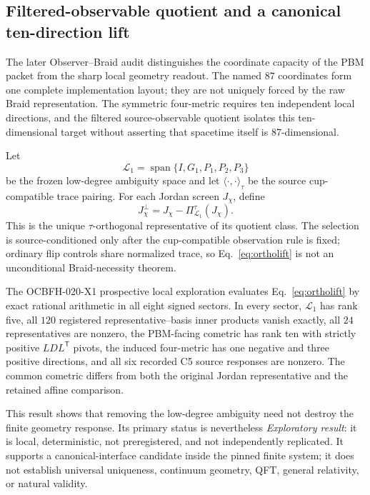 \documentclass[11pt]{article}
\theoremstyle{definition}
\theoremstyle{remark}
\begin{document}
\subsection{Filtered-observable quotient and a canonical ten-direction lift}

The later Observer--Braid audit distinguishes the coordinate capacity of the PBM packet from the sharp local geometry readout. The named $87$ coordinates form one complete implementation layout; they are not uniquely forced by the raw Braid representation. The symmetric four-metric requires ten independent local directions, and the filtered source-observable quotient isolates this ten-dimensional target without asserting that spacetime itself is 87-dimensional.

Let
\begin{equation}
 \mathcal L_1=\operatorname{span}\{I,G_1,P_1,P_2,P_3\}
\end{equation}
be the frozen low-degree ambiguity space and let $\langle\cdot,\cdot\rangle_\tau$ be the source cup-compatible trace pairing. For each Jordan screen $J_\chi$, define
\begin{equation}\label{eq:ortholift}
 J_\chi^\perp=J_\chi-\Pi_{\mathcal L_1}^{\tau}(J_\chi).
\end{equation}
This is the unique $\tau$-orthogonal representative of its quotient class. The selection is source-conditioned only after the cup-compatible observation rule is fixed; ordinary flip controls share normalized trace, so Eq.~\eqref{eq:ortholift} is not an unconditional Braid-necessity theorem.

The OCBFH-020-X1 prospective local exploration evaluates Eq.~\eqref{eq:ortholift} by exact rational arithmetic in all eight signed sectors. In every sector, $\mathcal L_1$ has rank five, all $120$ registered representative--basis inner products vanish exactly, all $24$ representatives are nonzero, the PBM-facing cometric has rank ten with strictly positive $LDL^{\mathsf T}$ pivots, the induced four-metric has one negative and three positive directions, and all six recorded C5 source responses are nonzero. The common cometric differs from both the original Jordan representative and the retained affine comparison.

This result shows that removing the low-degree ambiguity need not destroy the finite geometry response. Its primary status is nevertheless \emph{Exploratory result}: it is local, deterministic, not preregistered, and not independently replicated. It supports a canonical-interface candidate inside the pinned finite system; it does not establish universal uniqueness, continuum geometry, QFT, general relativity, or natural validity.
\end{document}
